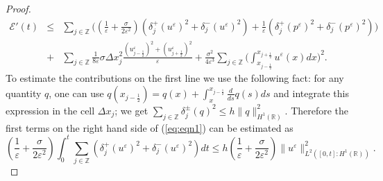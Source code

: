 \documentclass[a4paper,french,english,10pt]{article}
\newcommand\eps{\varepsilon}
\begin{document}
\begin{proof}
\begin{eqnarray} \label{eq:eqn1}
\mathscr{E}'(t)  & \leq & \sum_{j\in \mathbb{Z}} \bigg(
\left( \frac{1}{\eps}+\frac{\sigma}{2\eps^2}\right)\left ( 
\delta_{j}^+(u^{\eps})^2+\delta_{j}^-(u^{\eps})^2\right )
+\frac{1}{\eps}\left (
\delta_{j}^+(p^{\eps})^2+\delta_{j}^-(p^{\eps}
)^2\right ) \bigg) \\
&+& \underset{j\in \mathbb{Z}}{\sum} \frac{1}{8\eps} \sigma \Delta x_j^2
\frac{(u_{j-\frac12 }^{\eps})^2+(
u_{j+\frac12 }^{\eps})^2}{\eps}+\frac{\sigma^2}{4\eps^3} \sum_{j\in
\mathbb{Z}}\bigg( {\int_{x_{j-\frac12}}^{x_{j+\frac12}}} u^{\eps}(x) dx \bigg)^2.
\end{eqnarray} 
To estimate the contributions on the first line we use the following fact:
for any quantity $q$, one can use  $q(x_{j-\frac12})=q(x)+\int_x^{x_{j-\frac12}}\frac{d}{ds}q(s)ds$
 and integrate this
expression in the cell $\Delta x_j$; we
get $ \sum_{j\in \mathbb{Z}} \delta_{j}^\pm(q)^2\leq
h \| q \|_{H^1(\mathbb{R})}^2$. 
Therefore
the first terms on the right hand side of (\ref{eq:eqn1}) can be estimated as
$$
\left( \frac{1}{\eps}+\frac{\sigma}{2\eps^2}\right)
\int_0^t 
\sum_{j\in \mathbb{Z}} 
\left ( 
\delta_{j}^+(u^{\eps})^2+\delta_{j}^-(u^{\eps})^2\right )dt
\leq h \left( \frac{1}{\eps}+\frac{\sigma}{2\eps^2}\right)
\|  u^\eps  \|^2_{ L^2( [0,t] : H^1(\mathbb R)) }.
$$



\end{proof}
\end{document}
